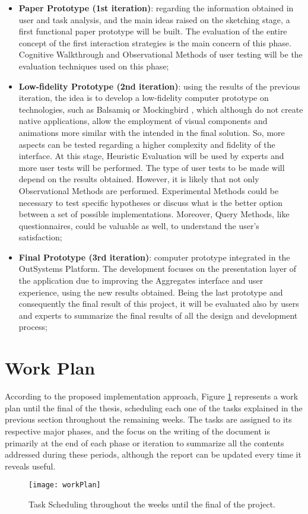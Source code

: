 \begin{itemize}
    \begin{itemize}
        \item \textbf{Paper Prototype (1st iteration)}: regarding the information obtained in user and task analysis, and the main ideas raised on the sketching stage, a first functional paper prototype will be built. The evaluation of the entire concept of the first interaction strategies is the main concern of this phase. Cognitive Walkthrough and Observational Methods of user testing will be the evaluation techniques used on this phase;
        \item \textbf{Low-fidelity Prototype (2nd iteration)}: using the results of the previous iteration, the idea is to develop a low-fidelity computer prototype on technologies, such as Balsamiq \cite{balsamiq} or Mockingbird \cite{mockingbird}, which although do not create native applications, allow the employment of visual components and animations more similar with the intended in the final solution. So, more aspects can be tested regarding a higher complexity and fidelity of the interface. At this stage, Heuristic Evaluation will be used by experts and more user tests will be performed. The type of user tests to be made will depend on the results obtained. However, it is likely that not only Observational Methods are performed. Experimental Methods could be necessary to test specific hypotheses or discuss what is the better option between a set of possible implementations. Moreover, Query Methods, like questionnaires, could be valuable as well, to understand the user’s satisfaction;
        \item \textbf{Final Prototype (3rd iteration)}: computer prototype integrated in the OutSystems Platform. The development focuses on the presentation layer of the application due to improving the Aggregates interface and user experience, using the new results obtained. Being the last prototype and consequently the final result of this project, it will be evaluated also by users and experts to summarize the final results of all the design and development process;
    \end{itemize}

\end{itemize}

\section{Work Plan}
\label{sec:work_plan}
According to the proposed implementation approach, Figure \ref{fig:work_plan} represents a work plan until the final of the thesis, scheduling each one of the tasks explained in the previous section throughout the remaining weeks. The tasks are assigned to its respective major phases, and the focus on the writing of the document is primarily at the end of each phase or iteration to summarize all the contents addressed during these periods, although the report can be updated every time it reveals useful.

\begin{figure}[htbp]
	\centering
	\texttt{[image: workPlan]}
	\caption{Task Scheduling throughout the weeks until the final of the project.}
	\label{fig:work_plan}
\end{figure}



